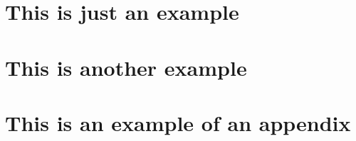 \documentclass[12pt, lof, lot]{ULInternshipReport}
\begin{document}
\chapter{This is just an example}
\lipsum

\chapter{This is another example}
\lipsum

\appendix

\chapter{This is an example of an appendix}
\lipsum
\end{document}
